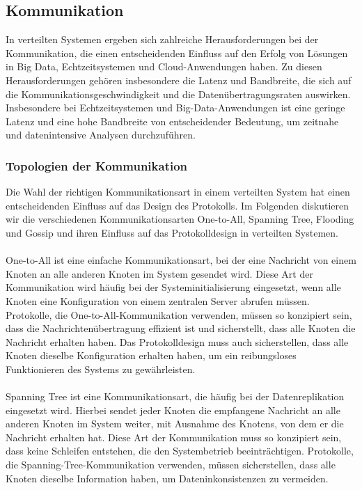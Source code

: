 \subsection{Kommunikation}

In verteilten Systemen ergeben sich zahlreiche Herausforderungen bei der Kommunikation, die einen entscheidenden Einfluss auf den Erfolg von Lösungen in Big Data, Echtzeitsystemen und Cloud-Anwendungen haben. Zu diesen Herausforderungen gehören insbesondere die Latenz und Bandbreite, die sich auf die Kommunikationsgeschwindigkeit und die Datenübertragungsraten auswirken. Insbesondere bei Echtzeitsystemen und Big-Data-Anwendungen ist eine geringe Latenz und eine hohe Bandbreite von entscheidender Bedeutung, um zeitnahe und datenintensive Analysen durchzuführen.
\subsubsection{Topologien der Kommunikation}
Die Wahl der richtigen Kommunikationsart in einem verteilten System hat einen entscheidenden Einfluss auf das Design des Protokolls. Im Folgenden diskutieren wir die verschiedenen Kommunikationsarten One-to-All, Spanning Tree, Flooding und Gossip und ihren Einfluss auf das Protokolldesign in verteilten Systemen.
\\\\
One-to-All ist eine einfache Kommunikationsart, bei der eine Nachricht von einem Knoten an alle anderen Knoten im System gesendet wird. Diese Art der Kommunikation wird häufig bei der Systeminitialisierung eingesetzt, wenn alle Knoten eine Konfiguration von einem zentralen Server abrufen müssen. Protokolle, die One-to-All-Kommunikation verwenden, müssen so konzipiert sein, dass die Nachrichtenübertragung effizient ist und sicherstellt, dass alle Knoten die Nachricht erhalten haben. Das Protokolldesign muss auch sicherstellen, dass alle Knoten dieselbe Konfiguration erhalten haben, um ein reibungsloses Funktionieren des Systems zu gewährleisten.
\\\\
Spanning Tree ist eine Kommunikationsart, die häufig bei der Datenreplikation eingesetzt wird. Hierbei sendet jeder Knoten die empfangene Nachricht an alle anderen Knoten im System weiter, mit Ausnahme des Knotens, von dem er die Nachricht erhalten hat. Diese Art der Kommunikation muss so konzipiert sein, dass keine Schleifen entstehen, die den Systembetrieb beeinträchtigen. Protokolle, die Spanning-Tree-Kommunikation verwenden, müssen sicherstellen, dass alle Knoten dieselbe Information haben, um Dateninkonsistenzen zu vermeiden.
